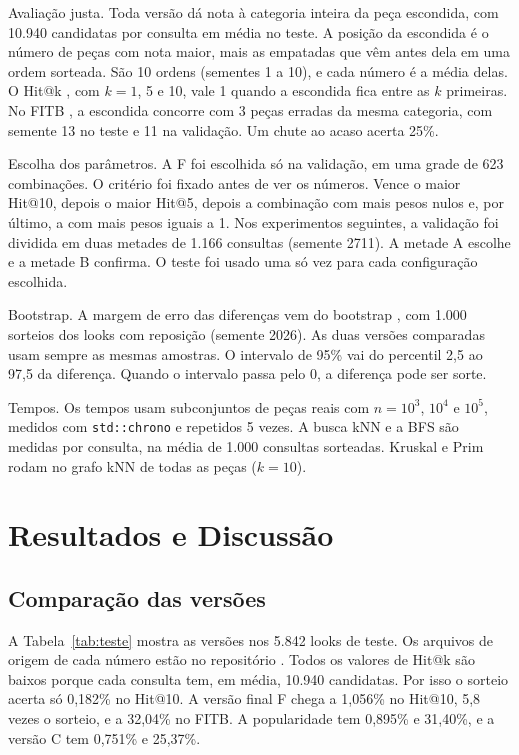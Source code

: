 \documentclass[conference]{IEEEtran}
\begin{document}
Avaliação justa. Toda versão dá nota à categoria inteira da peça escondida, com 10.940 candidatas por consulta em média no teste. A posição da escondida é o número de peças com nota maior, mais as empatadas que vêm antes dela em uma ordem sorteada. São 10 ordens (sementes 1 a 10), e cada número é a média delas. O Hit@k \cite{deshpande2004}, com $k = 1$, 5 e 10, vale 1 quando a escondida fica entre as $k$ primeiras. No FITB \cite{han2017}, a escondida concorre com 3 peças erradas da mesma categoria, com semente 13 no teste e 11 na validação. Um chute ao acaso acerta 25\%.

Escolha dos parâmetros. A F foi escolhida só na validação, em uma grade de 623 combinações. O critério foi fixado antes de ver os números. Vence o maior Hit@10, depois o maior Hit@5, depois a combinação com mais pesos nulos e, por último, a com mais pesos iguais a 1. Nos experimentos seguintes, a validação foi dividida em duas metades de 1.166 consultas (semente 2711). A metade A escolhe e a metade B confirma. O teste foi usado uma só vez para cada configuração escolhida.

Bootstrap. A margem de erro das diferenças vem do bootstrap \cite{efron1979}, com 1.000 sorteios dos looks com reposição (semente 2026). As duas versões comparadas usam sempre as mesmas amostras. O intervalo de 95\% vai do percentil 2,5 ao 97,5 da diferença. Quando o intervalo passa pelo 0, a diferença pode ser sorte.

Tempos. Os tempos usam subconjuntos de peças reais com $n = 10^3$, $10^4$ e $10^5$, medidos com \texttt{std::chrono} e repetidos 5 vezes. A busca kNN e a BFS são medidas por consulta, na média de 1.000 consultas sorteadas. Kruskal e Prim \cite{prim1957} rodam no grafo kNN de todas as peças ($k = 10$).

\section{Resultados e Discussão}
\label{sec:res}
\subsection{Comparação das versões}

A Tabela~\ref{tab:teste} mostra as versões nos 5.842 looks de teste. Os arquivos de origem de cada número estão no repositório \cite{repositorio}. Todos os valores de Hit@k são baixos porque cada consulta tem, em média, 10.940 candidatas. Por isso o sorteio acerta só 0,182\% no Hit@10. A versão final F chega a 1,056\% no Hit@10, 5,8 vezes o sorteio, e a 32,04\% no FITB. A popularidade tem 0,895\% e 31,40\%, e a versão C tem 0,751\% e 25,37\%.
\end{document}

